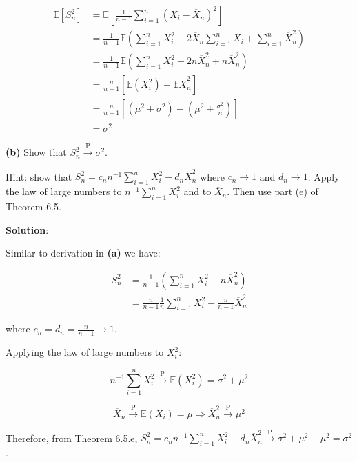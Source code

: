\begin{align*}
\mathbb{E}[S_{n}^{2}] & = \mathbb{E}\left[ \frac {1}{n-1} \sum_{i=1}^{n} \left(X_{i} - \overline{X}_{n} \right)^{2} \right] \\
& = \frac {1}{n-1} \mathbb{E} \left( \sum_{i=1}^{n} X_{i}^{2} - 2 \overline{X}_{n} \sum_{i=1}^{n} X_{i} + \sum_{i=1}^{n} \overline{X}_{n}^{2} \right) \\
& = \frac {1}{n-1} \mathbb{E} \left( \sum_{i=1}^{n} X_{i}^{2} - 2 n \overline{X}_{n}^{2} + n \overline{X}_{n}^{2} \right) \\
& = \frac {n}{n-1} \left[ \mathbb{E} (X_{i}^{2}) - \mathbb{E} \overline{X}_{n}^{2} \right] \\
& = \frac {n}{n-1} \left[ \left( \mu^{2}+\sigma^{2} \right) - \left( \mu^{2} + \frac {\sigma^{2}}{n} \right) \right] \\
& = \sigma^{2}
\end{align*}

\textbf{(b)} Show that \(S_{n}^{2} \xrightarrow{\text{P}} \sigma^{2}\).

Hint: show that
\(S_{n}^{2} = c_{n} n^{-1} \sum_{i=1}^{n} X_{i}^{2} - d_{n} \overline{X}_{n}^{2}\) where
\(c_{n} \rightarrow 1\) and \(d_{n} \rightarrow 1\). Apply the law of large
numbers to \(n^{-1}\sum_{i=1}^{n} X_{i}^{2}\) and to \(\overline{X}_{n}\). Then
use part (e) of Theorem 6.5.

\textbf{Solution}:

Similar to derivation in \textbf{(a)} we have:

\begin{align*}
S_{n}^{2} & = \frac {1}{n-1} \left( \sum_{i=1}^{n} X_{i}^{2} - n \overline{X}_{n}^{2} \right) \\
& = \frac{n}{n-1} \frac{1}{n} \sum_{i=1}^{n} X_{i}^{2} - \frac{n}{n-1} \overline{X}_{n}^{2} 
\end{align*}

where \(c_{n} = d_{n} = \frac{n}{n-1} \rightarrow 1\).

Applying the law of large numbers to \(X_{i}^{2}\):

\[ n^{-1} \sum_{i=1}^{n} X_{i}^{2} \xrightarrow{\text{P}} \mathbb{E}(X_{i}^{2}) = \sigma^{2} + \mu^{2}\]

\[ \overline{X}_{n} \xrightarrow{\text{P}} \mathbb{E}(X_{i}) = \mu \Rightarrow \overline{X}_{n}^{2} \xrightarrow{\text{P}} \mu^{2} \]

Therefore, from Theorem 6.5.e, $ S_{n}^{2} = c_{n} n^{-1}
\sum_{i=1}^{n} X_{i}^{2} - d_{n} \overline{X}_{n}^{2}
\xrightarrow{\text{P}} \sigma^{2} + \mu^{2} - \mu^{2} =
\sigma^{2}$.

